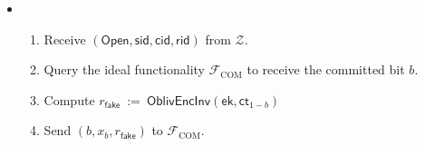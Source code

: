 \documentclass[11pt,letterpaper]{article}
\theoremstyle{plain} %
\theoremstyle{definition} %
\theoremstyle{remark} %
\newcommand{\eqdef}{\ {:=} \ }
\newcommand{\OpenMsg}{\mathsf{Open}}
\newcommand{\Input}{x}
\newcommand{\OblivEncInv}{\mathsf{OblivEncInv}}
\newcommand{\EncKey}{\mathsf{ek}}
\newcommand{\Ct}{\mathsf{ct}}
\newcommand{\Rand}{r}
\newcommand{\Environment}{{\mathcal{Z}}} %
\newcommand{\IF}{\mathcal{F}} %
\newcommand{\sid}{\mathsf{sid}}
\newcommand{\CommitterId}{\mathsf{cid}}
\newcommand{\ReceiverId}{\mathsf{rid}}
\newcommand{\IFCom}{\IF_{\mathrm{COM}}}
\newcommand{\CommBit}{b}
\begin{document}
\begin{itemize}
\item {}
\newcommand{\fake}{\mathsf{fake}}
\begin{enumerate}[nolistsep]
    \item Receive $(\OpenMsg,\sid,\CommitterId,\ReceiverId)$ from $\Environment$.
	\item Query the ideal functionality $\IFCom$ to receive the committed bit $\CommBit$.
    \item Compute $\Rand_{\fake} \eqdef \OblivEncInv(\EncKey, \Ct_{1-\CommBit})$
    \item Send $(\CommBit, \Input_{\CommBit}, \Rand_{\fake})$ to $\IFCom$.
\end{enumerate}

\end{itemize}

\end{document}
